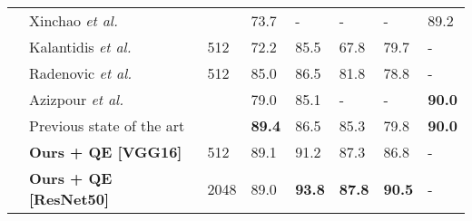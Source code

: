\documentclass[runningheads]{llncs}
\def\etal{\emph{et al.}~}
\begin{document}
\begin{table}[h]
\begin{tabularx}{\textwidth}{@{}p{0.5cm}p{3.7cm}p{0.8cm}YYYYY@{}}
 &{\scriptsize Xinchao \etal \cite{Xinchao2015}} &&73.7  & - & -  & - & 89.2 \\
 &{\scriptsize Kalantidis \etal \cite{Kalantidis2015}} & {\scriptsize 512}& 72.2  & 85.5 & 67.8  & 79.7 &  - \\
 &{\scriptsize Radenovic \etal \cite{Radenovic2016}} & {\scriptsize 512}& 85.0 &86.5 & 81.8 & 78.8  & - \\
 &{\scriptsize Azizpour \etal \cite{Azizpour2015}} &  & 79.0 & 85.1 & -  & -  & \textbf{90.0} \\
 & Previous state of the art & & \textbf{89.4} \cite{Tolias2015b} & 86.5 \cite{Tolias2016} & 85.3 \cite{Tolias2015} & 79.8 \cite{Tolias2016} & \textbf{90.0} \cite{Azizpour2015}\\
 &{\footnotesize \textbf{Ours + QE [VGG16]}} & {\scriptsize 512} & 89.1 & 91.2 & 87.3 & 86.8 & - \\ 
 &{\footnotesize \textbf{Ours + QE [ResNet50]}} & {\scriptsize 2048} & 89.0  & \textbf{93.8} & \textbf{87.8} & \textbf{90.5} & - \\ 
 \bottomrule
 \end{tabularx}
 \end{table}

 
 
\end{document}
